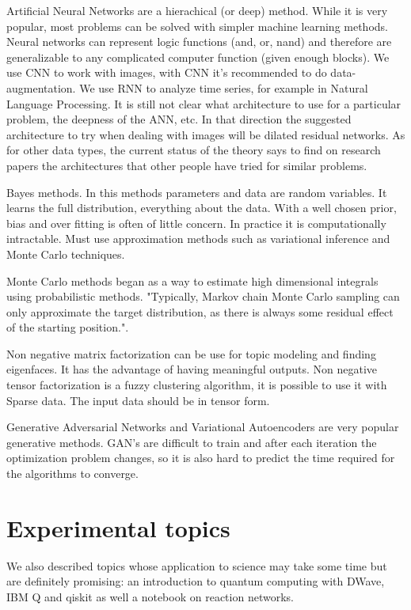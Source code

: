 \documentclass[11pt,letterpaper]{report}
\begin{document}
Artificial Neural Networks are a hierachical (or deep) method. While it is very popular, most problems can be solved with simpler machine learning methods\cite{Gron}. Neural networks can represent logic functions (and, or, nand) and therefore are generalizable to any complicated computer function (given enough blocks). We use CNN to work with images, with CNN it's recommended to do data-augmentation. We use RNN to analyze time series, for example in Natural Language Processing.
It is still not clear what architecture\cite{Lin2017} to use for a particular problem,   the deepness of the ANN, etc. In that direction the suggested architecture to try when dealing with images will be dilated residual networks\cite{DRN}. As for other data types, the current status of the theory says to find on research papers the architectures that other people have tried for similar problems.


Bayes methods. In this methods parameters and data are random variables. It learns the full distribution, everything about the data. With a well chosen prior, bias and over fitting is often of little concern. In practice it is computationally intractable. Must use approximation methods such as variational inference and Monte Carlo techniques.

 Monte Carlo methods began as a way to estimate high dimensional integrals using probabilistic methods. "Typically, Markov chain Monte Carlo sampling can only approximate the target distribution, as there is always some residual effect of the starting position."\cite{wmcmc}.

Non negative matrix factorization can be use for topic modeling and finding eigenfaces. It has the advantage of having meaningful outputs\cite{Lee1999}. Non negative tensor factorization is a fuzzy clustering algorithm, it is possible to use it with   Sparse data\cite{Ho2014a}. The input data should be in tensor form.

Generative Adversarial Networks and Variational Autoencoders are very popular generative methods. GAN's are difficult to train and after each iteration the optimization problem changes, so it is also hard to predict the time required for the algorithms to converge. 


\section{Experimental topics}We also described topics whose application to science may take some time but are definitely promising: an introduction to quantum computing with DWave, IBM Q and qiskit as well a notebook on reaction networks.
	
	
	
	
	
	
\end{document}
